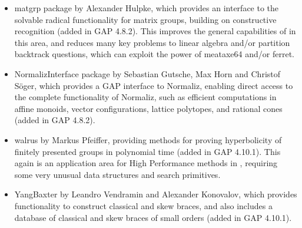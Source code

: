 \begin{itemize}
\item
{\sf matgrp} package by Alexander Hulpke, which provides an interface
to the solvable radical functionality for matrix groups, building on
constructive recognition (added in GAP 4.8.2). This improves the
general capabilities of \GAP in this area, and reduces many key
problems to linear algebra and/or partition backtrack questions, which
can exploit the power of meataxe64 and/or ferret.

\item
{\sf NormalizInterface} package by Sebastian Gutsche, Max Horn and
Christof S\"oger, which provides a GAP interface to Normaliz, enabling
direct access to the complete functionality of Normaliz, such as efficient
computations in affine monoids, vector configurations, lattice
polytopes, and rational cones (added in GAP 4.8.2). 

\item
{\sf walrus} by Markus Pfeiffer, providing methods for proving 
hyperbolicity of finitely presented groups in polynomial time
(added in GAP 4.10.1). This again is an application area for High
Performance methods in \GAP, requiring some very unusual data
structures and search primitives.

\item
{\sf YangBaxter} by Leandro Vendramin and Alexander Konovalov, 
which provides functionality to construct classical and 
skew braces, and also includes a database of classical 
and skew braces of small orders (added in GAP 4.10.1).

\end{itemize}
